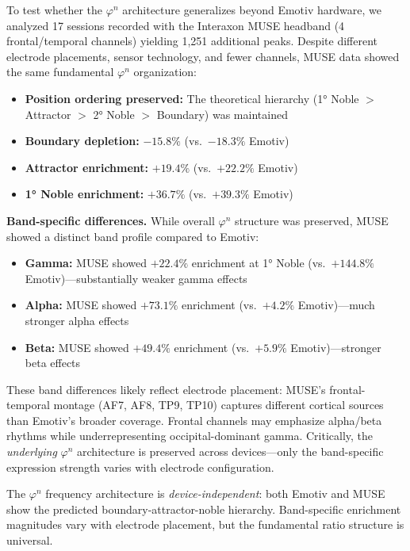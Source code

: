 \documentclass[11pt,a4paper]{article}
\newcommand{\phisym}{\varphi}
\begin{document}
To test whether the $\phisym^n$ architecture generalizes beyond Emotiv hardware, we analyzed 17 sessions recorded with the Interaxon MUSE headband (4 frontal/temporal channels) yielding 1,251 additional peaks. Despite different electrode placements, sensor technology, and fewer channels, MUSE data showed the same fundamental $\phisym^n$ organization:

\begin{itemize}
    \item \textbf{Position ordering preserved:} The theoretical hierarchy (1° Noble $>$ Attractor $>$ 2° Noble $>$ Boundary) was maintained
    \item \textbf{Boundary depletion:} $-15.8\%$ (vs.\ $-18.3\%$ Emotiv)
    \item \textbf{Attractor enrichment:} $+19.4\%$ (vs.\ $+22.2\%$ Emotiv)
    \item \textbf{1° Noble enrichment:} $+36.7\%$ (vs.\ $+39.3\%$ Emotiv)
\end{itemize}

\textbf{Band-specific differences.} While overall $\phisym^n$ structure was preserved, MUSE showed a distinct band profile compared to Emotiv:

\begin{itemize}
    \item \textbf{Gamma:} MUSE showed $+22.4\%$ enrichment at 1° Noble (vs.\ $+144.8\%$ Emotiv)---substantially weaker gamma effects
    \item \textbf{Alpha:} MUSE showed $+73.1\%$ enrichment (vs.\ $+4.2\%$ Emotiv)---much stronger alpha effects
    \item \textbf{Beta:} MUSE showed $+49.4\%$ enrichment (vs.\ $+5.9\%$ Emotiv)---stronger beta effects
\end{itemize}

These band differences likely reflect electrode placement: MUSE's frontal-temporal montage (AF7, AF8, TP9, TP10) captures different cortical sources than Emotiv's broader coverage. Frontal channels may emphasize alpha/beta rhythms while underrepresenting occipital-dominant gamma. Critically, the \textit{underlying} $\phisym^n$ architecture is preserved across devices---only the band-specific expression strength varies with electrode configuration.

\begin{keyinsight}
The $\phisym^n$ frequency architecture is \textit{device-independent}: both Emotiv and MUSE show the predicted boundary-attractor-noble hierarchy. Band-specific enrichment magnitudes vary with electrode placement, but the fundamental ratio structure is universal.
\end{keyinsight}
\end{document}
